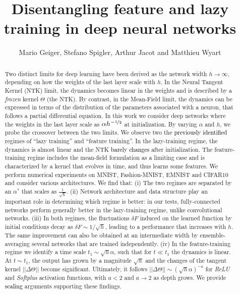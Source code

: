 \documentclass{article}
\title{Disentangling feature and lazy training in deep neural networks}
\author{%
Mario Geiger, Stefano Spigler, Arthur Jacot and Matthieu Wyart
}
\newcommand{\mm}[1]{\textcolor{black}{#1}}
\newcommand{\abs}[1]{|\!|#1|\!|}
\begin{document}
\maketitle


\begin{abstract}
Two distinct limits for deep learning have been derived as the network width $h\rightarrow \infty$, depending on how the weights of the last layer scale with $h$. In the Neural Tangent Kernel (NTK) limit, the dynamics becomes linear in the weights and is described by a \emph{frozen} kernel $\Theta$ (the NTK). By contrast, in the Mean-Field limit, the dynamics can be expressed in terms of the distribution of the parameters associated with a neuron, that follows a partial differential equation.
In this work we consider deep networks where the weights in the last layer scale as $\alpha h^{-\nicefrac12}$ at initialization. By varying $\alpha$ and $h$, we probe the crossover between the two limits.
We observe two the \mm{previously identified} regimes of ``lazy training'' and ``feature training''. In the lazy-training regime, the dynamics is almost linear and the NTK \mm{barely changes} after initialization. The feature-training regime includes the mean-field formulation as a limiting case and is characterized by a kernel that evolves in time, and thus learns some features.
We perform numerical experiments on MNIST, Fashion-MNIST, EMNIST and CIFAR10 and consider various architectures.
We find that: (i) The two regimes are separated by an $\alpha^*$ that scales as $\frac{1}{\sqrt{h}}$. 
(ii) Network architecture and data structure play an important role in determining which regime is better: in our tests, fully-connected networks  perform generally better in the lazy-training regime, unlike convolutional networks. 
(iii) In both regimes, the fluctuations $\delta F$ induced on the learned function by initial conditions decay as $\delta F \sim 1/\sqrt{h}$, leading to a performance that increases with $h$.
The same improvement can also be obtained at an intermediate width by ensemble-averaging several networks that are trained independently. 
(iv) In the feature-training regime we identify a time scale $t_1 \sim \sqrt{h}\alpha$, such that for $t \ll t_1$ the dynamics is linear. At $t \sim t_1$, the output has grown by a magnitude $\sqrt{h}$ and the changes of the tangent kernel $\abs{\Delta \Theta}$ become significant. Ultimately, it follows $\abs{\Delta \Theta} \sim (\sqrt{h}\alpha)^{-a}$ for \textit{ReLU} and \textit{Softplus} activation functions, with $a < 2$ and $a \to 2$ as depth grows. We provide \mm{scaling} arguments supporting these findings.
\end{abstract}
\end{document}
